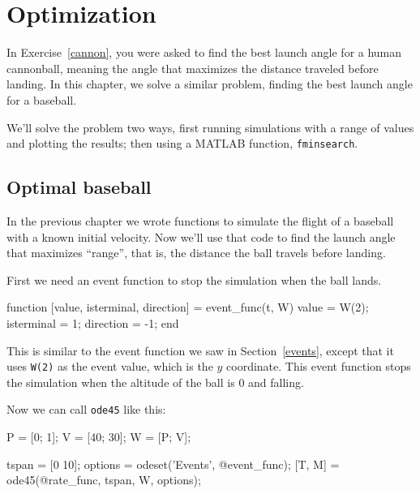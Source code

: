 \chapter{Optimization}

In Exercise~\ref{cannon}, you were asked to find the best launch angle for a human cannonball, meaning the angle that maximizes the distance traveled before landing.  In this chapter, we solve a similar problem, finding the best launch angle for a baseball.


We'll solve the problem two ways, first running simulations with a range of values and plotting the results; then using a MATLAB function, {\tt fminsearch}.


\section{Optimal baseball}

In the previous chapter we wrote functions to simulate the flight of a baseball with a known initial velocity.  Now we'll use that code to find the launch angle that maximizes ``range'', that is, the distance the ball travels before landing.


First we need an event function to stop the simulation when the ball lands.

\begin{code}
function [value, isterminal, direction] = event_func(t, W)
    value = W(2);
    isterminal = 1;
    direction = -1;
end
\end{code}


This is similar to the event function we saw in Section~\ref{events}, except that it uses {\tt W(2)} as the event value, which is the $y$ coordinate.  This event function stops the simulation when the altitude of the ball is 0 and falling.

Now we can call {\tt ode45} like this:

\begin{code}
    P = [0; 1];       %
    V = [40; 30];     %
    W = [P; V];       %
    
    tspan = [0 10];
    options = odeset('Events', @event_func);
    [T, M] = ode45(@rate_func, tspan, W, options);
\end{code}

